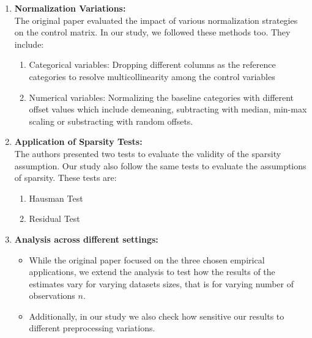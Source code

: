 \begin{enumerate}
    \item \textbf{Normalization Variations:}\\
    The original paper evaluated the impact of various normalization strategies on the control matrix. In our study, we followed these methods too. They include:
    \begin{enumerate}
        \item Categorical variables: Dropping different columns as the reference categories to resolve multicollinearity among the control variables
        \item Numerical variables: Normalizing the baseline categories with different offset values which include demeaning, subtracting with median, min-max scaling or substracting with random offsets. 
    \end{enumerate}

    \item \textbf{Application of Sparsity Tests:}\\
    The authors presented two tests to evaluate the validity of the sparsity assumption. Our study also follow the same tests to evaluate the assumptions of sparsity. These tests are:\\
    \begin{enumerate}
        \item Hausman Test
        \item Residual Test
    \end{enumerate}

    \item \textbf{Analysis across different settings:}\\
    \begin{itemize}
        \item While the original paper focused on the three chosen empirical applications, we extend the analysis to test how the results of the estimates vary for varying datasets sizes, that is for varying number of observations $n$. 
        \item Additionally, in our study we also check how sensitive our results to different preprocessing variations. 
    \end{itemize}
    

    
\end{enumerate}